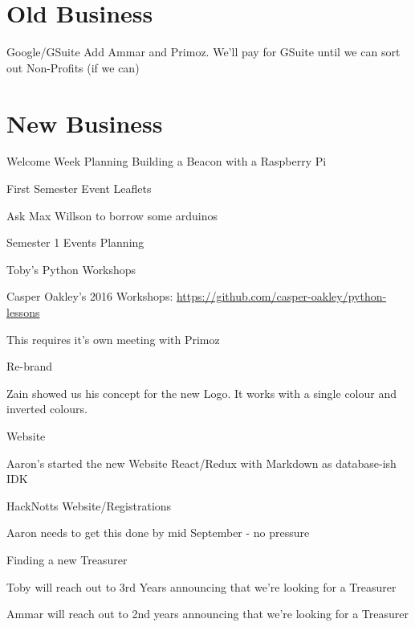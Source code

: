 \documentclass[11pt,hacksoc]{meetingmins}
\begin{document}
\section{Old Business}
\begin{items}
	\item
	Google/GSuite
		\subitem
		Add Ammar and Primoz. We'll pay for GSuite until we can sort out Non-Profits (if we can)
\end{items}

\section{New Business}
\begin{items}
	\item
	Welcome Week Planning
		\subitem
		Building a Beacon with a Raspberry Pi
		
		\subitem
		First Semester Event Leaflets
		
		\subitem
		Ask Max Willson to borrow some arduinos
	
	\item
	Semester 1 Events Planning

		\subitem
		Toby's Python Workshops
			
			\subsubitem
			Casper Oakley's 2016 Workshops: \hyperlink{https://github.com/casper-oakley/python-lessons}{https://github.com/casper-oakley/python-lessons}
			
		\subitem
		This requires it's own meeting with Primoz
		
			
	\item
	Re-brand
	
		\subitem
		Zain showed us his concept for the new Logo. It works with a single colour and inverted colours.
	
	\item
	Website
		
		\subitem
		Aaron's started the new Website React/Redux with Markdown as database-ish IDK
		
	\item
	HackNotts Website/Registrations
		
		\subitem
		Aaron needs to get this done by mid September - no pressure
	
	\item
	Finding a new Treasurer
	
		\subitem
		Toby will reach out to 3rd Years announcing that we're looking for a Treasurer
		
		\subitem
		Ammar will reach out to 2nd years announcing that we're looking for a Treasurer
		

\end{items}
\end{document}
